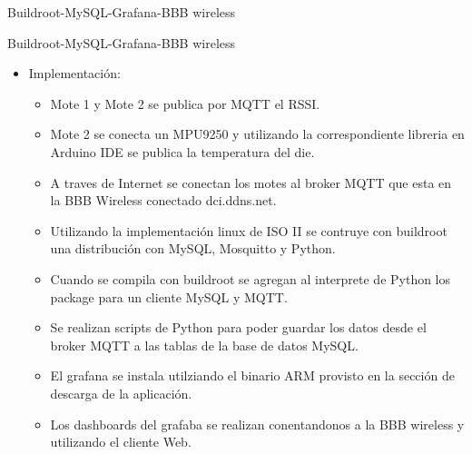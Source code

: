 \documentclass[aspectratio= 43]{beamer}
\begin{document}
\begin{frame}{Buildroot-MySQL-Grafana-BBB wireless}
\end{frame}

\begin{frame}{Buildroot-MySQL-Grafana-BBB wireless}
 \begin{itemize}
     \item{Implementación:}
      \begin{itemize}
               \item{Mote 1 y Mote 2 se publica por MQTT el RSSI.}
               \item{Mote 2 se conecta un MPU9250 y utilizando la correspondiente libreria en Arduino IDE se publica la temperatura del die.}
               \item{A traves de Internet se conectan los motes al broker MQTT que esta en la BBB Wireless conectado dci.ddns.net.}
	    \item{Utilizando la implementación linux de ISO II se contruye con buildroot una distribución con MySQL, Mosquitto y Python.}
	    \item{Cuando se compila con buildroot se agregan al interprete de Python los package para un cliente MySQL y MQTT.}
               \item{Se realizan scripts de Python para poder guardar los datos desde el broker MQTT a las tablas de la base de datos MySQL.}
               \item{El grafana se instala utilziando el binario ARM provisto en la sección de descarga de la aplicación.}
               \item{Los dashboards del grafaba se realizan conentandonos a la BBB wireless y utilizando el cliente Web.}
      \end{itemize}
  \end{itemize}
\end{frame}
\end{document}
